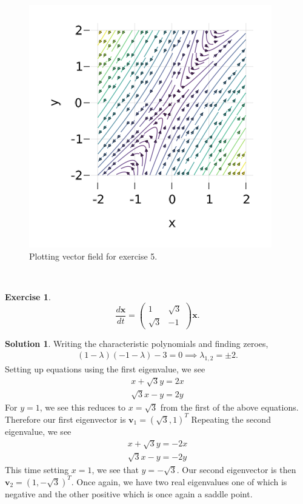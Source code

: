\documentclass[12pt]{article}
\renewcommand{\vec}[1]{\mathbf{#1}}
\theoremstyle{definition}
\newtheorem{exer}{Exercise}
\newtheorem{sol}{Solution}
\theoremstyle{remark}
\begin{document}
  \begin{figure}[h]
     \centering
     \includegraphics[width=0.8\linewidth]{figs/hw-1-exer-5.png}
     \caption{Plotting vector field for exercise 5.}%
     \label{fig:exer-5}
 \end{figure}

\newpage

\

\newpage

\begin{exer}
\begin{equation*}
\frac{d \vec{x}}{dt} 
=
\begin{pmatrix}
    1 & \sqrt{3}\\
    \sqrt{3} & -1
\end{pmatrix}
\vec{x}.
\end{equation*}
\end{exer}

\begin{sol}\leavevmode
    Writing the characteristic polynomials and finding zeroes,
    \begin{align*}
        (1 - \lambda)(-1 - \lambda) - 3 = 0 \implies \lambda_{1,2} = \pm 2.
    \end{align*}
    Setting up equations using the first eigenvalue, we see
    \begin{align*}
        x  + \sqrt{3} y = 2x\\
        \sqrt{3} x - y = 2y
    \end{align*}
    For $y = 1$, we see this reduces to $x = \sqrt{3}$ from the first of the above equations. Therefore our first eigenvector is $\vec{v}_{1} = (\sqrt{3}, 1)^{T}$ Repeating the second eigenvalue, we see
    \begin{align*}
        x  + \sqrt{3} y =-2x\\
        \sqrt{3} x - y = -2y
    \end{align*}
    This time setting $x = 1$, we see that $y = - \sqrt{3}$. Our second eigenvector is then $\vec{v}_{2} = (1, -\sqrt{3})^{T}$. Once again, we have two real eigenvalues one of which is negative and the other positive which is once again a saddle point.
 \end{sol}
\end{document}

